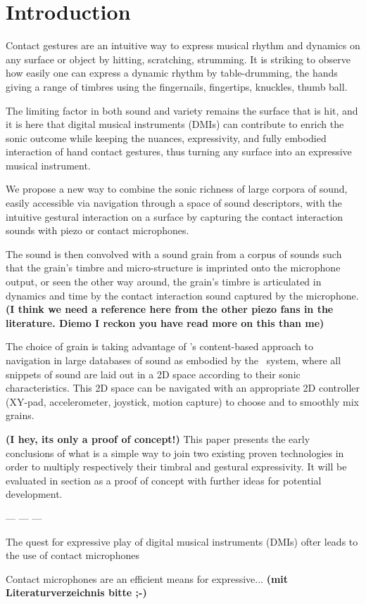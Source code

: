 \section{Introduction}


Contact gestures are an intuitive way to express musical rhythm and dynamics on any surface or object by hitting, scratching, strumming.  It is striking to observe how easily one can express a dynamic rhythm by table-drumming, the hands giving a range of timbres using the fingernails, fingertips, knuckles, thumb ball.


The limiting factor in both sound and variety remains the surface that is hit, and it is here that digital musical instruments (DMIs) can contribute to enrich the sonic outcome while keeping the nuances, expressivity, and fully embodied interaction of hand contact gestures, thus turning any surface into an expressive musical instrument.


We propose a new way to combine the sonic richness of large corpora of sound, easily accessible via navigation through a space of sound descriptors, with the intuitive gestural interaction on a surface by capturing the contact interaction sounds with piezo or contact microphones.


The sound is then convolved with a sound grain from a corpus of sounds such that the grain's timbre and micro-structure is imprinted onto the microphone output, or seen the other way around, the grain's timbre is articulated in dynamics and time by the contact interaction sound captured by the microphone. \textbf{(I think we need a reference here from the other piezo fans in the literature. Diemo I reckon you have read more on this than me)}


The choice of grain is taking advantage of \cbcs's content-based approach to navigation in large databases of sound as embodied by the \catart\ system, where all snippets of sound are laid out in a 2D space according to their sonic characteristics.  This 2D space can be navigated with an appropriate 2D controller (XY-pad, accelerometer, joystick, motion capture) to choose and to smoothly mix grains.

\textbf{(I hey, its only a proof of concept!)} This paper presents the early conclusions of what is a simple way to join two existing proven technologies in order to multiply respectively their timbral and gestural expressivity. It will be evaluated in section as a proof of concept with further ideas for potential development.

--- --- ---


The quest for expressive play of digital musical instruments (DMIs) ofter leads to the use of contact microphones


Contact microphones are an efficient means for expressive... \textbf{(mit Literaturverzeichnis bitte ;-)}
